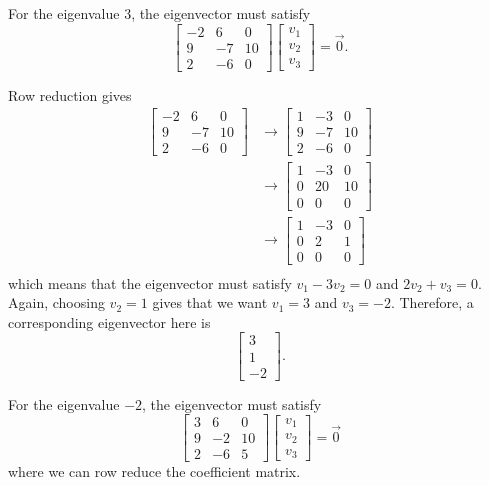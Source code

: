 \documentclass{ximera}
\begin{document}
\begin{exampleSol}
For the eigenvalue $3$, the eigenvector must satisfy
\[ 
    \begin{bmatrix} 
        -2 & 6 & 0 \\ 
        9 & -7 & 10 \\ 
        2 & -6 & 0 
    \end{bmatrix} 
    \begin{bmatrix} 
        v_1 \\ 
        v_2 \\ 
        v_3 
    \end{bmatrix} = \vec{0}. 
\]

Row reduction gives
\[ 
    \begin{split}
        \begin{bmatrix} 
            -2 & 6 & 0 \\ 
            9 & -7 & 10 \\ 
            2 & -6 & 0 
        \end{bmatrix} 
        &\rightarrow 
        \begin{bmatrix} 
            1 & -3 & 0 \\ 
            9 & -7 & 10 \\ 
            2 & -6 & 0 
        \end{bmatrix} \\
        &\rightarrow 
        \begin{bmatrix} 
            1 & -3 & 0 \\ 
            0 & 20 & 10 \\ 
            0 & 0 & 0 
        \end{bmatrix} \\
        &\rightarrow 
        \begin{bmatrix} 
            1 & -3 & 0 \\ 
            0 & 2 & 1 \\ 
            0 & 0 & 0 
        \end{bmatrix} \\
    \end{split}
\] 
which means that the eigenvector must satisfy $v_1 - 3v_2 = 0$ and $2v_2 + v_3 = 0$. Again, choosing $v_2 = 1$ gives that we want $v_1 = 3$ and $v_3 = -2$. Therefore, a corresponding eigenvector here is 
\[ 
    \begin{bmatrix} 
        3 \\ 
        1 \\ 
        -2 
    \end{bmatrix}. 
\]

For the eigenvalue $-2$, the eigenvector must satisfy
\[ 
    \begin{bmatrix} 
        3 & 6 & 0 \\ 
        9 & -2 & 10 \\ 
        2 & -6 & 5 
    \end{bmatrix} 
    \begin{bmatrix} 
        v_1 \\ 
        v_2 \\ 
        v_3 
    \end{bmatrix} = \vec{0} 
\] 
where we can row reduce the coefficient matrix.


\end{exampleSol}
\end{document}
